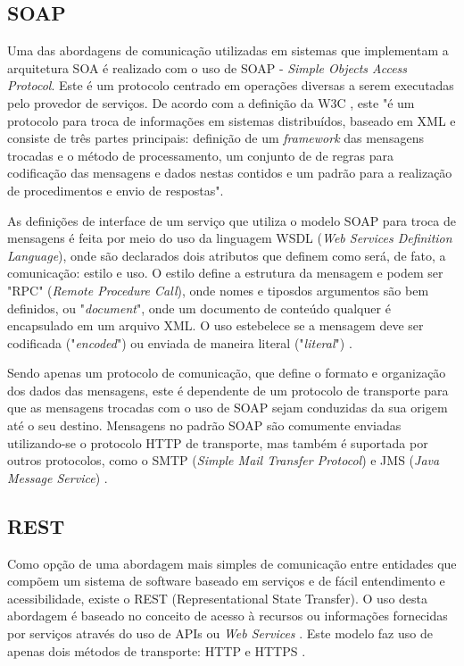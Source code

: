\subsection{SOAP}
Uma das abordagens de comunicação utilizadas em sistemas que implementam a arquitetura SOA é realizado com o uso de SOAP - \textit{Simple Objects Access Protocol}. Este é um protocolo centrado em operações diversas a serem executadas pelo provedor de serviços. De acordo com a definição da W3C \cite{box_simple_2000}, este "é um protocolo para troca de informações em sistemas distribuídos, baseado em XML e consiste de três partes principais: definição de um \textit{framework} das mensagens trocadas e o método de processamento, um conjunto de de regras para codificação das mensagens e dados nestas contidos e um padrão para a realização de procedimentos e envio de respostas".

As definições de interface de um serviço que utiliza o modelo SOAP para troca de mensagens é feita por meio do uso da linguagem WSDL (\textit{Web Services Definition Language}), onde são declarados dois atributos que definem como será, de fato, a comunicação: estilo e uso. O estilo define a estrutura da mensagem e podem ser "RPC" (\textit{Remote Procedure Call}), onde nomes e tiposdos argumentos são bem definidos, ou "\textit{document}", onde um documento de conteúdo qualquer é encapsulado em um arquivo XML. O uso estebelece se a mensagem deve ser codificada ("\textit{encoded}") ou enviada de maneira literal ("\textit{literal}") \cite{Bianco2007}.

Sendo apenas um protocolo de comunicação, que define o formato e organização dos dados das mensagens, este é dependente de um protocolo de transporte para que as mensagens trocadas com o uso de SOAP sejam conduzidas da sua origem até o seu destino. Mensagens no padrão SOAP são comumente enviadas utilizando-se o protocolo HTTP de transporte, mas também é suportada por outros protocolos, como o SMTP (\textit{Simple Mail Transfer Protocol}) e JMS (\textit{Java Message Service}) \cite{mueller_understanding_2013}.

\subsection{REST}
Como opção de uma abordagem mais simples de comunicação entre entidades que compõem um sistema de software baseado em serviços e de fácil entendimento e acessibilidade, existe o REST (Representational State Transfer). O uso desta abordagem é baseado no conceito de acesso à recursos ou informações fornecidas por serviços através do uso de APIs ou \textit{Web Services} \cite{Bianco2007}. Este modelo faz uso de apenas dois métodos de transporte: HTTP e HTTPS \cite{rozlog_restesoap_2013}.

